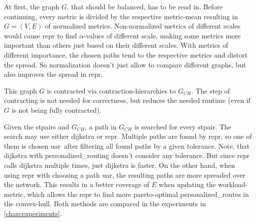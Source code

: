         At first, the graph $G$, that should be balanced, has to be read in.
        Before continuing, every \gls{metric} is divided by the respective \gls{metric}-mean resulting in $G = (V, E)$ of normalized \glspl{metric}.
        Non-normalized \glspl{metric} of different scales would cause \gls{repr} to find $\alpha$-values of different scale, making some \glspl{metric} more important than others just based on their different scales.
        With \glspl{metric} of different importance, the chosen paths tend to the respective \glspl{metric} and distort the spread.
        So normalization doesn't just allow to compare different graphs, but also improves the spread in \gls{repr}.

        This graph $G$ is contracted via \gls{contraction-hierarchies} to $G_{CH}$.
        The step of contracting is not needed for correctness, but reduces the needed runtime (even if $G$ is not being fully contracted).

        Given the \glspl{stpair} and $G_{CH}$, a path in $G_{CH}$ is searched for every \gls{stpair}.
        The search may use either \gls{dijkstra} or \gls{repr}.
        Multiple paths are found by \gls{repr}, so one of them is chosen \gls{uar}\ after filtering all found paths by a given tolerance.
        Note, that \gls{dijkstra} with \gls{personalized_routing} doesn't consider any tolerance.
        But since \gls{repr} calls \gls{dijkstra} multiple times, just \gls{dijkstra} is faster.
        On the other hand, when using \gls{repr} with choosing a path \gls{uar}, the resulting paths are more spreaded over the network.
        This results in a better coverage of $E$ when updating the workload-\gls{metric}, which allows the \gls{repr} to find more pareto-optimal \glspl{personalized_route} in the convex-hull.
        Both methods are compared in the experiments in \vref{chap:experiments}.

